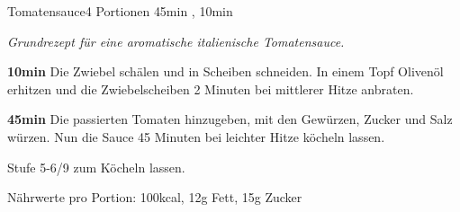 \documentclass[../recipe-collections/cooking.tex]{subfiles}
\begin{document}
\begin{recipe}{Tomatensauce}{4 Portionen }{45min , 10min }

  \freeform{}\textit{Grundrezept für eine aromatische italienische Tomatensauce.}


  \textbf{10min}
  Die Zwiebel schälen und in Scheiben schneiden.
  In einem Topf Olivenöl erhitzen und die Zwiebelscheiben 2 Minuten bei mittlerer Hitze anbraten.


  \textbf{45min}
  Die passierten Tomaten hinzugeben, mit den Gewürzen, Zucker und Salz würzen.
  Nun die Sauce 45 Minuten bei leichter Hitze köcheln lassen.

  \freeform{}\hrulefill{}

  \freeform{}
  Stufe 5-6/9 zum Köcheln lassen.

  \freeform{}
  Nährwerte pro Portion: 100kcal, 12g Fett, 15g Zucker

\end{recipe}
\end{document}

